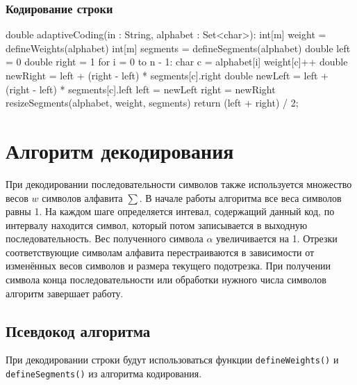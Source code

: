 \documentclass[12pt]{article}
\begin{document}
\subsubsection*{Кодирование строки}
\begin{listing}{1}
double adaptiveCoding(in : String, alphabet : Set<char>):
    int[m] weight = defineWeights(alphabet)
    int[m] segments = defineSegments(alphabet)
    double left = 0
    double right = 1
    for i = 0 to n - 1:
        char c = alphabet[i]
        weight[c]++
        double newRight = left + (right - left) * segments[c].right
        double newLeft = left + (right - left) * segments[c].left
        left = newLeft
        right = newRight
        resizeSegments(alphabet, weight, segments)
    return (left + right) / 2;
\end{listing}

\section*{Алгоритм декодирования}
При декодировании последовательности символов также используется множество весов $w$ символов алфавита $\sum$. В начале работы алгоритма все веса символов равны 1.  На каждом шаге определяется интевал, содержащий данный код, по интервалу находится символ, который потом записывается в выходную последовательность. Вес полученного символа $\alpha$ увеличивается на 1. Отрезки соответствующие символам алфавита перестраиваются в зависимости от изменённых весов символов и размера текущего подотрезка. При получении символа конца последовательности или обработки нужного числа символов алгоритм завершает работу.

\subsection*{Псевдокод алгоритма}
При декодировании строки будут использоваться функции \verb'defineWeights()' и \verb'defineSegments()' из алгоритма кодирования.
\end{document}
